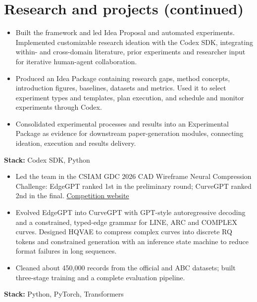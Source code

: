 \documentclass[11pt,a4paper]{article}
\begin{document}
\section{Research and projects (continued)}
\begin{itemize}
\item Built the framework and led Idea Proposal and automated experiments. Implemented customizable research ideation with the Codex SDK, integrating within- and cross-domain literature, prior experiments and researcher input for iterative human-agent collaboration.
\item Produced an Idea Package containing research gaps, method concepts, introduction figures, baselines, datasets and metrics. Used it to select experiment types and templates, plan execution, and schedule and monitor experiments through Codex.
\item Consolidated experimental processes and results into an Experimental Package as evidence for downstream paper-generation modules, connecting ideation, execution and results delivery.
\end{itemize}
\textbf{Stack:} Codex SDK, Python

\begin{itemize}
\item Led the team in the CSIAM GDC 2026 CAD Wireframe Neural Compression Challenge: EdgeGPT ranked 1st in the preliminary round; CurveGPT ranked 2nd in the final. \href{https://mathmagic-official.github.io/AICAD/}{Competition website}
\item Evolved EdgeGPT into CurveGPT with GPT-style autoregressive decoding and a constrained, typed-edge grammar for LINE, ARC and COMPLEX curves. Designed HQVAE to compress complex curves into discrete RQ tokens and constrained generation with an inference state machine to reduce format failures in long sequences.
\item Cleaned about 450,000 records from the official and ABC datasets; built three-stage training and a complete evaluation pipeline.
\end{itemize}
\textbf{Stack:} Python, PyTorch, Transformers
\end{document}
